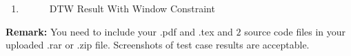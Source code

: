 \documentclass[12pt,a4paper]{article}
\makeatletter
\newtheorem*{solution}{Solution}
\theoremstyle{definition}
\renewenvironment{solution}[1][Solution] {\par\pushQED{\qed}\normalfont\topsep6\p@\@plus6\p@\relax\trivlist\item[\hskip\labelsep\bfseries#1\@addpunct{.}]\ignorespaces}{\popQED\endtrivlist\@endpefalse} \makeatother
\makeatother
\begin{document}
\begin{enumerate}
\begin{solution}
\begin{enumerate}
		    \begin{figure}
            \centering
            \hspace{1in}
            \caption{DTW Result With Window Constraint}
            \label{Fig-DTWConstraint} 
            \end{figure}
            
		\end{enumerate}
		\end{solution}
		
	\end{enumerate}
	
	\vspace{20pt}
	
	\textbf{Remark:} You need to include your .pdf and .tex and {\color{red}\emph{$2$}} source code files in your uploaded .rar or .zip file. Screenshots of test case results are acceptable.
	
\end{document}
